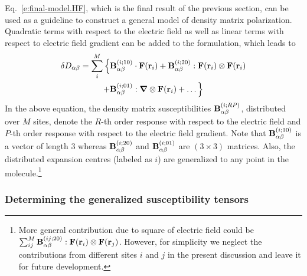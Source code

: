 \documentclass[aip,amsmath,amssymb,reprint,floatfix]{revtex4-1}
\newcommand{\BM}[1]{\bm{#1}}
\begin{document}
Eq.~\eqref{e:final-model.HF}, which is the final result of the previous section, 
can be used as a guideline to construct a general model of density matrix polarization.
Quadratic terms with respect to the electric field as well as linear terms with respect to
electric field gradient can be added to the formulation, which leads to
%
\begin{multline}\label{e:final-model.General}
 \delta D_{\alpha\beta} = \sum_{i }^M \Big\{
                                      {\bf B}^{(i ; 10)}_{\alpha\beta} \cdot {\bf F}({\bf r}_i)  
                        +             {\bf B}^{(i ; 20)}_{\alpha\beta} : {\bf F}({\bf r}_i) \otimes {\bf F}({\bf r}_i) \\
                        +             {\bf B}^{(i ; 01)}_{\alpha\beta} : {\BM\nabla} \otimes {\bf F}({\bf r}_i) 
                        + \ldots \Big\}
\end{multline}
%
In the above equation, the density matrix susceptibilities
${\bf B}^{(i; RP)}_{\alpha\beta}$, distributed over $M$ sites,
denote the $R$-th order response with respect to the electric field
and $P$-th order response with respect to the electric field gradient. Note that
${\bf B}^{(i; 10)}_{\alpha\beta}$ is a vector of length $3$ whereas ${\bf B}^{(i; 20)}_{\alpha\beta}$
and ${\bf B}^{(i; 01)}_{\alpha\beta}$ are $(3\times 3)$ matrices. Also, the distributed expansion centres
(labeled as $i$) are generalized to any point in the molecule.\footnote{More general
contribution due to square of electric field could be $\sum_{ij}^M {\bf B}^{(ij; 20)}_{\alpha\beta} : {\bf F}({\bf r}_i) \otimes {\bf F}({\bf r}_j)$. However, for simplicity we neglect the contributions from different sites $i$ and $j$
in the present discussion and leave it for future development.
}

\subsubsection{Determining the generalized susceptibility tensors}
\end{document}
